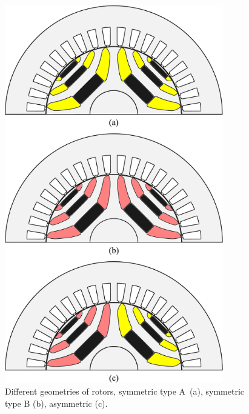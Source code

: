 \documentclass[a4paper, twoside, 11pt]{article}
\begin{document}
    \begin{minipage}[t]{0.45\textwidth}
        \begin{figure}[H]
            \centering
            \includegraphics[width=0.85\textwidth]{src/png/asymmetrical-rotor-flux-barriers.png}
            \caption{Different geometries of rotors, symmetric type A~(a), symmetric type B (b), asymmetric (c). \cite{bianchi-Experimental-comparison-of-PM-assisted-synchronous-reluctance-motors}}
            \label{fig:asymmetrical-rotor-flux-barriers}
        \end{figure}
    \end{minipage}%
    \hspace{0.05\linewidth}
\end{document}
